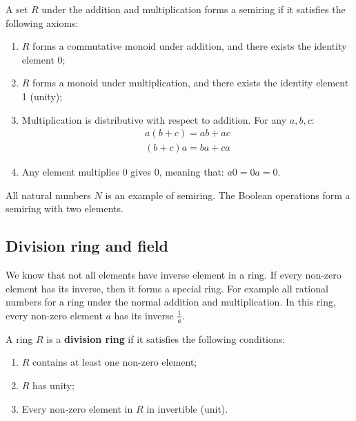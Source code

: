\documentclass{article}
\begin{document}
\begin{definition}
A set $R$ under the addition and multiplication forms a semiring if it satisfies the following axioms:
\begin{enumerate}
\item $R$ forms a commutative monoid under addition, and there exists the identity element 0;
\item $R$ forms a monoid under multiplication, and there exists the identity element 1 (unity);
\item Multiplication is distributive with respect to addition. For any $a, b, c$:
\[
\begin{array}{l}
a(b + c) = ab + ac \\
(b + c)a = ba + ca
\end{array}
\]
\item Any element multiplies 0 gives 0, meaning that: $a0 = 0a = 0$.
\end{enumerate}
\end{definition}
All natural numbers $N$ is an example of semiring. The Boolean operations form a semiring with two elements.

\begin{Exercise}
\end{Exercise}

\subsection{Division ring and field}

We know that not all elements have inverse element in a ring. If every non-zero element has its inverse, then it forms a special ring. For example all rational numbers for a ring under the normal addition and multiplication. In this ring, every non-zero element $a$ has its inverse $\frac{1}{a}$.

\begin{definition}
A ring $R$ is a \textbf{division ring} if it satisfies the following conditions:
\begin{enumerate}
\item $R$ contains at least one non-zero element;
\item $R$ has unity;
\item Every non-zero element in $R$ in invertible (unit).
\end{enumerate}
\end{definition}
\end{document}
